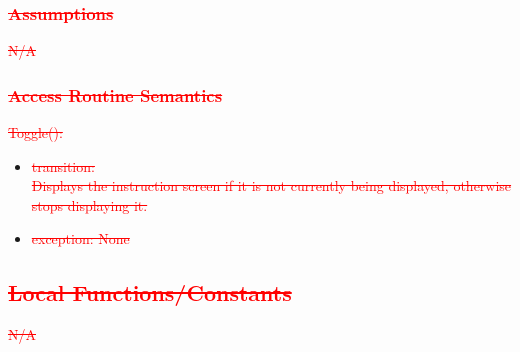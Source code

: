 \documentclass[12pt]{article}
\begin{document}
\subsubsection{\textcolor{red}{\sout{Assumptions}}}
\textcolor{red}{\sout{N/A}}

\subsubsection{\textcolor{red}{\sout{Access Routine Semantics}}}
\noindent \textcolor{red}{\sout{Toggle():}}
\begin{itemize}
	\item \textcolor{red}{\sout{transition:}}\\
	    \textcolor{red}{\sout{Displays the instruction screen if it is not currently being displayed, otherwise stops displaying it.}}
	\item \textcolor{red}{\sout{exception: None}}
\end{itemize}

\subsection{\textcolor{red}{\sout{Local Functions/Constants}}}
\textcolor{red}{\sout{N/A}}
\end{document}
